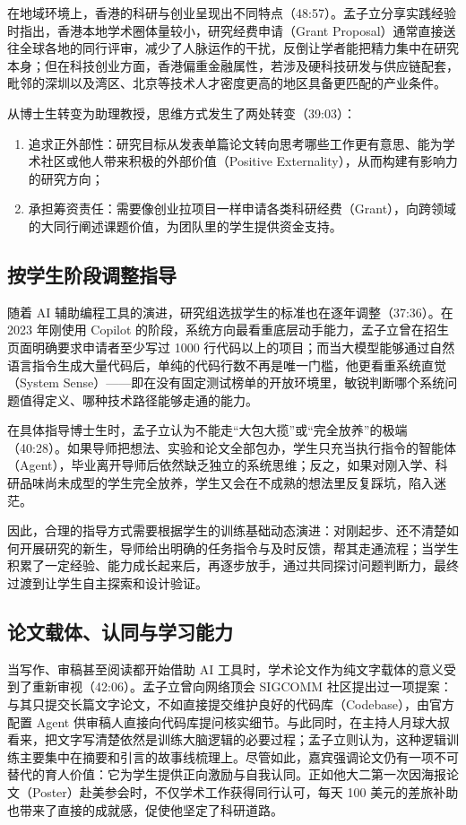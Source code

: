 \documentclass[UTF8,a4paper,11pt,fontset=fandol]{ctexart}
\begin{document}
在地域环境上，香港的科研与创业呈现出不同特点（48:57）。孟子立分享实践经验时指出，香港本地学术圈体量较小，研究经费申请（Grant Proposal）通常直接送往全球各地的同行评审，减少了人脉运作的干扰，反倒让学者能把精力集中在研究本身；但在科技创业方面，香港偏重金融属性，若涉及硬科技研发与供应链配套，毗邻的深圳以及湾区、北京等技术人才密度更高的地区具备更匹配的产业条件。

从博士生转变为助理教授，思维方式发生了两处转变（39:03）：
\begin{enumerate}
\item 追求正外部性：研究目标从发表单篇论文转向思考哪些工作更有意思、能为学术社区或他人带来积极的外部价值（Positive Externality），从而构建有影响力的研究方向；
\item 承担筹资责任：需要像创业拉项目一样申请各类科研经费（Grant），向跨领域的大同行阐述课题价值，为团队里的学生提供资金支持。
\end{enumerate}

\subsection{按学生阶段调整指导}
随着 AI 辅助编程工具的演进，研究组选拔学生的标准也在逐年调整（37:36）。在 2023 年刚使用 Copilot 的阶段，系统方向最看重底层动手能力，孟子立曾在招生页面明确要求申请者至少写过 1000 行代码以上的项目；而当大模型能够通过自然语言指令生成大量代码后，单纯的代码行数不再是唯一门槛，他更看重系统直觉（System Sense）——即在没有固定测试榜单的开放环境里，敏锐判断哪个系统问题值得定义、哪种技术路径能够走通的能力。

在具体指导博士生时，孟子立认为不能走“大包大揽”或“完全放养”的极端（40:28）。如果导师把想法、实验和论文全部包办，学生只充当执行指令的智能体（Agent），毕业离开导师后依然缺乏独立的系统思维；反之，如果对刚入学、科研品味尚未成型的学生完全放养，学生又会在不成熟的想法里反复踩坑，陷入迷茫。

因此，合理的指导方式需要根据学生的训练基础动态演进：对刚起步、还不清楚如何开展研究的新生，导师给出明确的任务指令与及时反馈，帮其走通流程；当学生积累了一定经验、能力成长起来后，再逐步放手，通过共同探讨问题判断力，最终过渡到让学生自主探索和设计验证。

\subsection{论文载体、认同与学习能力}
当写作、审稿甚至阅读都开始借助 AI 工具时，学术论文作为纯文字载体的意义受到了重新审视（42:06）。孟子立曾向网络顶会 SIGCOMM 社区提出过一项提案：与其只提交长篇文字论文，不如直接提交维护良好的代码库（Codebase），由官方配置 Agent 供审稿人直接向代码库提问核实细节。与此同时，在主持人月球大叔看来，把文字写清楚依然是训练大脑逻辑的必要过程；孟子立则认为，这种逻辑训练主要集中在摘要和引言的故事线梳理上。尽管如此，嘉宾强调论文仍有一项不可替代的育人价值：它为学生提供正向激励与自我认同。正如他大二第一次因海报论文（Poster）赴美参会时，不仅学术工作获得同行认可，每天 100 美元的差旅补助也带来了直接的成就感，促使他坚定了科研道路。
\end{document}

